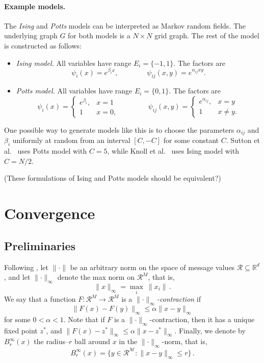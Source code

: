 \documentclass[11pt,a4paper]{article}
\theoremstyle{remark}
\newcommand{\Reals}{\mathbb{R}}
\newcommand{\R}{\mathcal{R}}
\newcommand{\M}{\mathcal{M}}
\newcommand{\range}{E}
\newcommand{\norm}[1]{\lVert #1 \rVert}
\begin{document}
\paragraph{Example models.} The \emph{Ising} and \emph{Potts} models can be interpreted as Markov random fields. The underlying graph $G$ for both models is a $N \times N$ grid graph. The rest of the model is constructed as follows:
\begin{itemize}
    \item \emph{Ising model.} All variables have range $\range_{i} = \{ -1, 1 \}$. The factors are
    \begin{equation*}
        \psi_i(x) = e^{\beta_{i} x}, \qquad\qquad
        \psi_{ij}(x,y) = e^{\alpha_{ij}xy}.
    \end{equation*}
    \item \emph{Potts model.} All variables have range $\range_{i} = \{ 0, 1 \}$. The factors are
    \begin{equation*}
        \psi_i(x) = \begin{cases} e^{\beta_{i}}, & x = 1 \\1 & x = 0, \end{cases} \qquad\qquad
        \psi_{ij}(x,y) = \begin{cases} e^{\alpha_{ij}}, & x = y \\1 & x \ne y. \end{cases}
    \end{equation*}
\end{itemize}
One possible way to generate models like this is to choose the parameters $\alpha_{ij}$ and $\beta_i$ uniformly at random from an interval $[C, -C]$ for some constant $C$. Sutton et al.~\cite{Sutton:2007:IDS:3020488.3020534} uses Potts model with $C = 5$, while Knoll et al.~\cite{10.1007/978-3-319-23525-7_18} uses Ising model with $C = N/2$.

(These formulations of Ising and Potts models should be equivalent?)


\section{Convergence}

\subsection{Preliminaries}

Following \cite{elidan2006residual}, let $\norm{\cdot}$ be an arbitrary norm on the space of message values $\R \subseteq \Reals^d$, and let $\norm{\cdot}_\infty$ denote the max norm on $\R^M$, that is, 
\[ \norm{x}_\infty = \max_{i}\  \norm{x_i}\,.\]
We say that a function $F \colon \R^M \to \R^M$ is a \emph{$\norm{\cdot}_\infty$-contraction} if
\[ \norm{ F(x) - F(y)}_{\infty} \le \alpha \norm{x - y}_\infty \]
for some $0 < \alpha < 1$. Note that if $F$ is a $\norm{\cdot}_\infty$-contraction, then it has a unique fixed point $z^*$, and $\norm{ F(x) - z^*}_{\infty} \le \alpha \norm{x - z^*}_\infty$.
Finally, we denote by $B^\infty_r(x)$ the radius–$r$ ball around $x$ in the $\norm{\cdot}_\infty$-norm, that is,
\[ B^\infty_r(x) = \{ y \in \R^\M  \colon \norm{x - y}_\infty \le r  \}\,. \]
\end{document}
